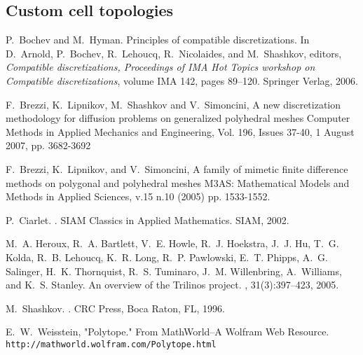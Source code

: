 \documentclass[pdf,12pt,relaxed]{SANDreport}
\begin{document}
    \subsection{Custom cell topologies}\label{sec:custom}



    \clearpage
    \providecommand*{\phantomsection}{}
    \phantomsection
    
    
    

\begin{thebibliography}{99}

P.~Bochev and M.~Hyman.
\newblock Principles of compatible discretizations.
\newblock In D.~Arnold, P.~Bochev, R.~Lehoucq, R.~Nicolaides, and M.~Shashkov,
  editors, {\em Compatible discretizations, Proceedings of IMA Hot Topics
  workshop on Compatible discretizations}, volume IMA 142, pages 89--120.
  Springer Verlag, 2006.


 F.~Brezzi, K.~Lipnikov, M.~Shashkov and V.~Simoncini,
\newblock A new discretization methodology for diffusion problems on generalized polyhedral meshes
Computer Methods in Applied Mechanics and Engineering, Vol. 196, Issues 37-40, 1 August 2007, pp. 3682-3692

 F.~Brezzi, K.~Lipnikov, and V.~Simoncini,
\newblock A family of mimetic finite difference methods on polygonal and polyhedral meshes
M3AS: Mathematical Models and Methods in Applied Sciences, v.15 n.10 (2005) pp. 1533-1552.

P.~Ciarlet.
.
\newblock SIAM Classics in Applied Mathematics. SIAM, 2002.


M.~A. Heroux, R.~A. Bartlett, V.~E. Howle, R.~J. Hoekstra, J.~J. Hu, T.~G.
  Kolda, R.~B. Lehoucq, K.~R. Long, R.~P. Pawlowski, E.~T. Phipps, A.~G.
  Salinger, H.~K. Thornquist, R.~S. Tuminaro, J.~M. Willenbring, A.~Williams,
  and K.~S. Stanley.
\newblock An overview of the {T}rilinos project.
, 31(3):397--423, 2005.

M.~Shashkov.
.
\newblock CRC Press, Boca Raton, FL, 1996.

 E.~W.~Weisstein,  "Polytope." From MathWorld--A Wolfram Web Resource. 
{\tt http://mathworld.wolfram.com/Polytope.html}

\end{thebibliography}
\end{document}
